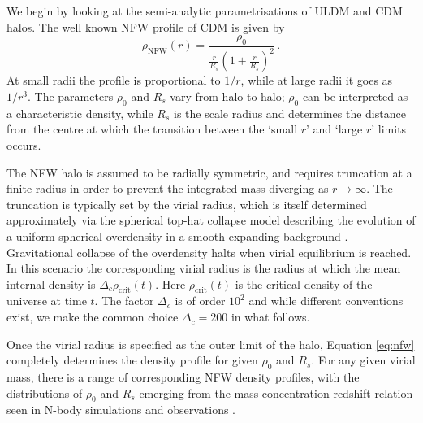\documentclass{pasa}%
\begin{document}
We begin by looking at the semi-analytic parametrisations of ULDM and CDM halos. The  well known  NFW   profile of CDM \cite{Navarro:1995iw, Maccio:2008pcd} is given by
%
\begin{equation}\label{eq:nfw}
    \rho_\mathrm{NFW}(r)=\frac{\rho_0}{\frac{r}{R_s}\left(1+\frac{r}{R_s}\right)^2} \, .
\end{equation}
%
At small radii the profile is proportional to $1/r$, while at large radii it goes as $1/r^3$. The parameters $\rho_0$ and $R_s$ vary from halo to halo; $\rho_0$ can be interpreted as a characteristic density, while $R_s$ is the scale radius and determines the distance from the centre at which the transition between the `small $r$' and `large $r$' limits occurs. 

The NFW halo is assumed to be radially symmetric, and requires truncation at a finite radius in order to prevent the integrated mass diverging as $r\rightarrow \infty$. The truncation is typically set by the virial radius, which is itself determined approximately via the spherical top-hat collapse model describing the evolution of a uniform spherical overdensity in a smooth expanding background \cite{White:2000jv, Suto:2015jdt, Herrera:2017epn}. Gravitational collapse of the overdensity halts when virial equilibrium is reached. In this scenario the corresponding virial radius is the radius at which the mean internal density is $\Delta_c \rho_\mathrm{crit}(t)$. Here $\rho_\mathrm{crit}(t)$ is the critical density of the universe at time $t$. The  factor $\Delta_c$ is of order $10^2$ and while different conventions exist, we  make the common choice $\Delta_c = 200$ \cite{Richings:2018} in what follows. 

Once the virial radius is specified as the outer limit of the halo, Equation \ref{eq:nfw} completely determines the density profile for given $\rho_0$ and $R_s$. For any given virial mass, there is a range of corresponding NFW density profiles, with the distributions of $\rho_0$ and $R_s$ emerging from the mass-concentration-redshift relation seen in N-body simulations and observations \cite{Ludlow:2013vxa, Ragagnin:2018enf}. 

\end{document}
